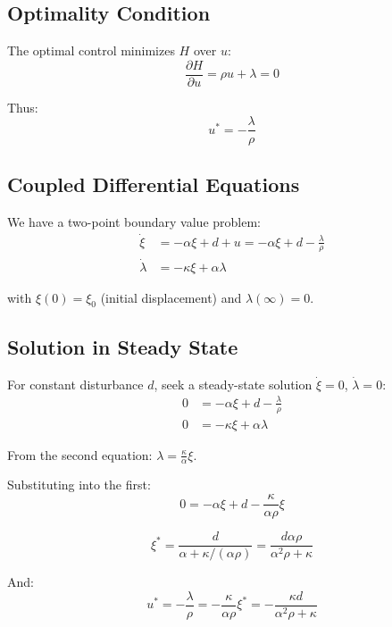 \documentclass[12pt]{article}
\begin{document}
\subsection{Optimality Condition}

The optimal control minimizes $H$ over $u$:
\begin{equation}
\frac{\partial H}{\partial u} = \rho u + \lambda = 0
\end{equation}

Thus:
\begin{equation}
u^* = -\frac{\lambda}{\rho}
\end{equation}

\subsection{Coupled Differential Equations}

We have a two-point boundary value problem:
\begin{align}
\dot{\xi} &= -\alpha \xi + d + u = -\alpha \xi + d - \frac{\lambda}{\rho} \\
\dot{\lambda} &= -\kappa \xi + \alpha \lambda
\end{align}

with $\xi(0) = \xi_0$ (initial displacement) and $\lambda(\infty) = 0$.

\subsection{Solution in Steady State}

For constant disturbance $d$, seek a steady-state solution $\dot{\xi} = 0$, $\dot{\lambda} = 0$:
\begin{align}
0 &= -\alpha \xi + d - \frac{\lambda}{\rho} \\
0 &= -\kappa \xi + \alpha \lambda
\end{align}

From the second equation: $\lambda = \frac{\kappa}{\alpha} \xi$.

Substituting into the first:
\begin{equation}
0 = -\alpha \xi + d - \frac{\kappa}{\alpha \rho} \xi
\end{equation}

\begin{equation}
\xi^* = \frac{d}{\alpha + \kappa/(\alpha \rho)} = \frac{d \alpha \rho}{\alpha^2 \rho + \kappa}
\end{equation}

And:
\begin{equation}
u^* = -\frac{\lambda}{\rho} = -\frac{\kappa}{\alpha \rho} \xi^* = -\frac{\kappa d}{\alpha^2 \rho + \kappa}
\end{equation}
\end{document}
